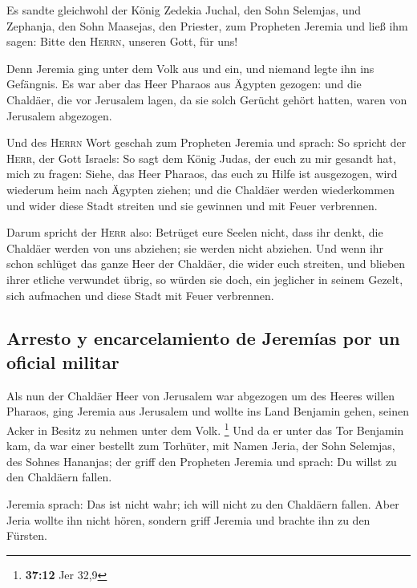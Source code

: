  Es sandte gleichwohl der König Zedekia Juchal, den Sohn
Selemjas, und Zephanja, den Sohn Maasejas, den Priester, zum Propheten
Jeremia und ließ ihm sagen: Bitte den \textsc{Herrn}, unseren Gott, für
uns!

 Denn Jeremia ging unter dem Volk aus und ein, und niemand
legte ihn ins Gefängnis.  Es war aber das Heer Pharaos aus
Ägypten gezogen: und die Chaldäer, die vor Jerusalem lagen, da sie solch
Gerücht gehört hatten, waren von Jerusalem abgezogen.

 Und des \textsc{Herrn} Wort geschah zum Propheten Jeremia
und sprach:  So spricht der \textsc{Herr}, der Gott
Israels: So sagt dem König Judas, der euch zu mir gesandt hat, mich zu
fragen: Siehe, das Heer Pharaos, das euch zu Hilfe ist ausgezogen, wird
wiederum heim nach Ägypten ziehen;  und die Chaldäer
werden wiederkommen und wider diese Stadt streiten und sie gewinnen und
mit Feuer verbrennen.

 Darum spricht der \textsc{Herr} also: Betrüget eure
Seelen nicht, dass ihr denkt, die Chaldäer werden von uns abziehen; sie
werden nicht abziehen.  Und wenn ihr schon schlüget das
ganze Heer der Chaldäer, die wider euch streiten, und blieben ihrer
etliche verwundet übrig, so würden sie doch, ein jeglicher in seinem
Gezelt, sich aufmachen und diese Stadt mit Feuer verbrennen.

\hypertarget{arresto-y-encarcelamiento-de-jeremuxedas-por-un-oficial-militar}{%
\subsection{Arresto y encarcelamiento de Jeremías por un oficial
militar}\label{arresto-y-encarcelamiento-de-jeremuxedas-por-un-oficial-militar}}

 Als nun der Chaldäer Heer von Jerusalem war abgezogen um
des Heeres willen Pharaos,  ging Jeremia aus Jerusalem
und wollte ins Land Benjamin gehen, seinen Acker in Besitz zu nehmen
unter dem Volk. \footnote{\textbf{37:12} Jer 32,9}  Und
da er unter das Tor Benjamin kam, da war einer bestellt zum Torhüter,
mit Namen Jeria, der Sohn Selemjas, des Sohnes Hananjas; der griff den
Propheten Jeremia und sprach: Du willst zu den Chaldäern fallen.

 Jeremia sprach: Das ist nicht wahr; ich will nicht zu
den Chaldäern fallen. Aber Jeria wollte ihn nicht hören, sondern griff
Jeremia und brachte ihn zu den Fürsten.

